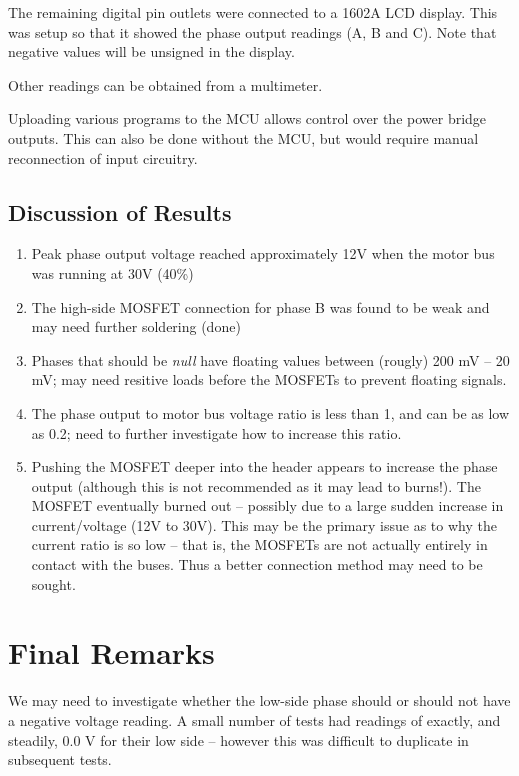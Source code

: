 \documentclass[a4paper]{article}
\begin{document}
  The remaining digital pin outlets were connected to a 1602A LCD
  display. This was setup so that it showed the phase output readings (A, B and
  C). Note that negative values will be unsigned in the display.

  Other readings can be obtained from a multimeter.

  Uploading various programs to the MCU allows control over the power bridge
  outputs. This can also be done without the MCU, but would require manual
  reconnection of input circuitry.

  \subsection{Discussion of Results}
  \begin{enumerate}
    \item Peak phase output voltage reached approximately 12V when the motor bus
    was running at 30V (40\%)
    \item The high-side MOSFET connection for phase B was found to be weak and
    may need further soldering (done)
    \item Phases that should be \textit{null} have floating values between
    (rougly) 200 mV -- 20 mV; may need resitive loads before the MOSFETs to
    prevent floating signals.
    \item The phase output to motor bus voltage ratio is less than 1, and can be
    as low as 0.2; need to further investigate how to increase this ratio.
    \item Pushing the MOSFET deeper into the header appears to increase the
    phase output (although this is not recommended as it may lead to burns!).
    The MOSFET eventually burned out -- possibly due to a large sudden increase in
    current/voltage (12V to 30V). This may be the primary issue as to why the
    current ratio is so low -- that is, the MOSFETs are not actually entirely in
    contact with the buses. Thus a better connection method may need to be sought.
  \end{enumerate}

\section{Final Remarks}
We may need to investigate whether the low-side phase should or should not have
a negative voltage reading. A small number of tests had readings of exactly, and
steadily, 0.0 V for
their low side -- however this was difficult to duplicate in subsequent tests.
\end{document}
